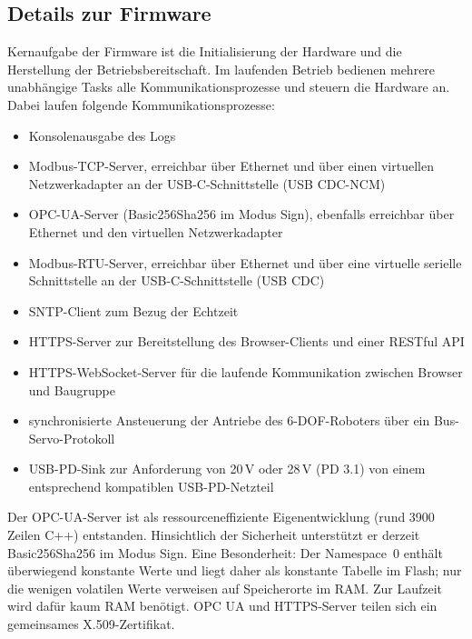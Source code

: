 \documentclass[]{article}%
\begin{document}
\subsection{Details zur Firmware}
Kernaufgabe der Firmware ist die Initialisierung der Hardware und die Herstellung der Betriebsbereitschaft. Im laufenden Betrieb bedienen mehrere unabhängige Tasks alle Kommunikationsprozesse und steuern die Hardware an. Dabei laufen folgende Kommunikationsprozesse:
\begin{itemize}
\item Konsolenausgabe des Logs
\item Modbus-TCP-Server, erreichbar über Ethernet und über einen virtuellen Netzwerkadapter an der USB-C-Schnittstelle (USB CDC-NCM)
\item OPC-UA-Server (Basic256Sha256 im Modus Sign), ebenfalls erreichbar über Ethernet und den virtuellen Netzwerkadapter
\item Modbus-RTU-Server, erreichbar über Ethernet und über eine virtuelle serielle Schnittstelle an der USB-C-Schnittstelle (USB CDC)
\item SNTP-Client zum Bezug der Echtzeit
\item HTTPS-Server zur Bereitstellung des Browser-Clients und einer RESTful API
\item HTTPS-WebSocket-Server für die laufende Kommunikation zwischen Browser und Baugruppe
\item synchronisierte Ansteuerung der Antriebe des 6-DOF-Roboters über ein Bus-Servo-Protokoll
\item USB-PD-Sink zur Anforderung von 20\,V oder 28\,V (PD 3.1) von einem entsprechend kompatiblen USB-PD-Netzteil
\end{itemize}

Der OPC-UA-Server ist als ressourceneffiziente Eigenentwicklung (rund 3900 Zeilen C++) entstanden. Hinsichtlich der Sicherheit unterstützt er derzeit Basic256Sha256 im Modus Sign. Eine Besonderheit: Der Namespace~0 enthält überwiegend konstante Werte und liegt daher als konstante Tabelle im Flash; nur die wenigen volatilen Werte verweisen auf Speicherorte im RAM. Zur Laufzeit wird dafür kaum RAM benötigt. OPC UA und HTTPS-Server teilen sich ein gemeinsames X.509-Zertifikat.
\end{document}
